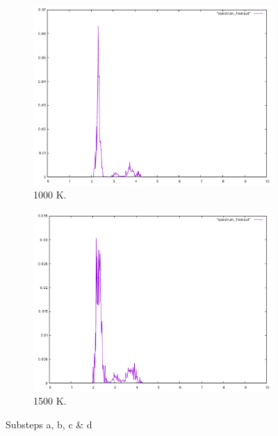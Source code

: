 \begin{figure}[h]
\begin{subfigure}[b]{0.48\linewidth}
\includegraphics[width=\linewidth]{./img/spectra_c}
\caption{1000 K.}
\end{subfigure}
\begin{subfigure}[b]{0.48\linewidth}
\includegraphics[width=\linewidth]{./img/spectra_d}
\caption{1500 K.}
\end{subfigure}
\caption{Substeps a, b, c \& d}
\label{substeps}
\end{figure}



